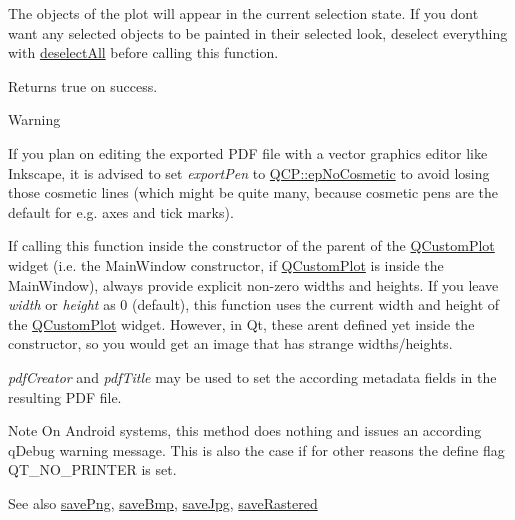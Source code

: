 The objects of the plot will appear in the current selection state. If you don\textquotesingle{}t want any selected objects to be painted in their selected look, deselect everything with \hyperlink{classQCustomPlot_a9d4808ab925b003054085246c92a257c}{deselect\+All} before calling this function.

Returns true on success.

\begin{DoxyWarning}{Warning}
\begin{DoxyItemize}
\item If you plan on editing the exported P\+DF file with a vector graphics editor like Inkscape, it is advised to set {\itshape export\+Pen} to \hyperlink{namespaceQCP_a17844f19e1019693a953e1eb93536d2faae8fcfaafee234ce18558afef83f6a78}{Q\+C\+P\+::ep\+No\+Cosmetic} to avoid losing those cosmetic lines (which might be quite many, because cosmetic pens are the default for e.\+g. axes and tick marks). \item If calling this function inside the constructor of the parent of the \hyperlink{classQCustomPlot}{Q\+Custom\+Plot} widget (i.\+e. the Main\+Window constructor, if \hyperlink{classQCustomPlot}{Q\+Custom\+Plot} is inside the Main\+Window), always provide explicit non-\/zero widths and heights. If you leave {\itshape width} or {\itshape height} as 0 (default), this function uses the current width and height of the \hyperlink{classQCustomPlot}{Q\+Custom\+Plot} widget. However, in Qt, these aren\textquotesingle{}t defined yet inside the constructor, so you would get an image that has strange widths/heights.\end{DoxyItemize}
{\itshape pdf\+Creator} and {\itshape pdf\+Title} may be used to set the according metadata fields in the resulting P\+DF file.
\end{DoxyWarning}
\begin{DoxyNote}{Note}
On Android systems, this method does nothing and issues an according q\+Debug warning message. This is also the case if for other reasons the define flag {\ttfamily Q\+T\+\_\+\+N\+O\+\_\+\+P\+R\+I\+N\+T\+ER} is set.
\end{DoxyNote}
\begin{DoxySeeAlso}{See also}
\hyperlink{classQCustomPlot_ac92cc9256d12f354b40a4be4600b5fb9}{save\+Png}, \hyperlink{classQCustomPlot_ae3a86ed0795670e50afa21759d4fa13d}{save\+Bmp}, \hyperlink{classQCustomPlot_a76f0d278e630a711fa6f48048cfd83e4}{save\+Jpg}, \hyperlink{classQCustomPlot_ad7723ce2edfa270632ef42b03a444352}{save\+Rastered} 
\end{DoxySeeAlso}
